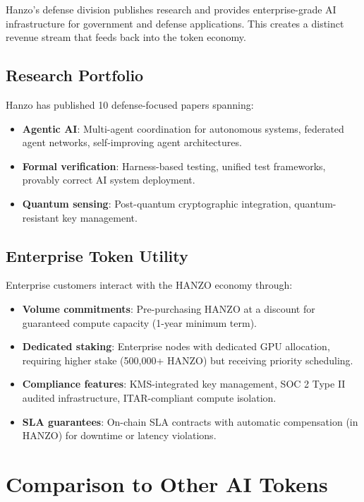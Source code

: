 \documentclass[11pt]{article}
\begin{document}
Hanzo's defense division publishes research and provides enterprise-grade AI
infrastructure for government and defense applications. This creates a distinct
revenue stream that feeds back into the token economy.

\subsection{Research Portfolio}

Hanzo has published 10 defense-focused papers spanning:

\begin{itemize}[leftmargin=1.1em]
    \item \textbf{Agentic AI}: Multi-agent coordination for autonomous systems,
    federated agent networks, self-improving agent architectures.
    \item \textbf{Formal verification}: Harness-based testing, unified test
    frameworks, provably correct AI system deployment.
    \item \textbf{Quantum sensing}: Post-quantum cryptographic integration,
    quantum-resistant key management.
\end{itemize}

\subsection{Enterprise Token Utility}

Enterprise customers interact with the HANZO economy through:

\begin{itemize}[leftmargin=1.1em]
    \item \textbf{Volume commitments}: Pre-purchasing HANZO at a discount for
    guaranteed compute capacity (1-year minimum term).
    \item \textbf{Dedicated staking}: Enterprise nodes with dedicated GPU
    allocation, requiring higher stake (500,000+ HANZO) but receiving
    priority scheduling.
    \item \textbf{Compliance features}: KMS-integrated key management, SOC 2 Type
    II audited infrastructure, ITAR-compliant compute isolation.
    \item \textbf{SLA guarantees}: On-chain SLA contracts with automatic
    compensation (in HANZO) for downtime or latency violations.
\end{itemize}

\section{Comparison to Other AI Tokens}
\label{sec:comparison}
\end{document}
